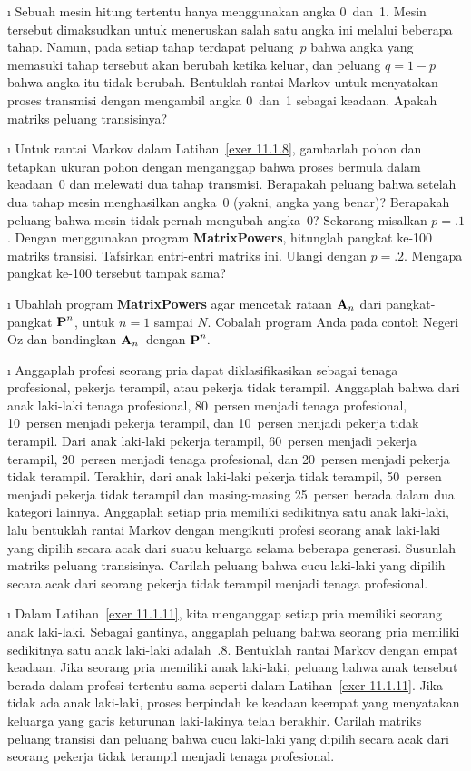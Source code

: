 \begin{LJSItem}
\i\label{exer 11.1.8} Sebuah mesin hitung tertentu hanya menggunakan angka
0~dan~1. Mesin tersebut dimaksudkan untuk meneruskan salah satu angka ini
melalui beberapa tahap. Namun, pada setiap tahap terdapat peluang~$p$ bahwa
angka yang memasuki tahap tersebut akan berubah ketika keluar, dan peluang $q
= 1 - p$ bahwa angka itu tidak berubah. Bentuklah rantai Markov untuk
menyatakan proses transmisi dengan mengambil angka 0~dan~1 sebagai keadaan.
Apakah matriks peluang transisinya?

\i\label{exer 11.1.9} Untuk rantai Markov dalam Latihan~\ref{exer 11.1.8},
gambarlah pohon dan tetapkan ukuran pohon dengan menganggap bahwa proses bermula
dalam keadaan~0 dan melewati dua tahap transmisi. Berapakah peluang bahwa
setelah dua tahap mesin menghasilkan angka~0 (yakni, angka yang benar)?
Berapakah peluang bahwa mesin tidak pernah mengubah angka~0? Sekarang misalkan
$p = .1$. Dengan menggunakan program {\bf MatrixPowers}, hitunglah pangkat
ke-100 matriks transisi. Tafsirkan entri-entri matriks ini. Ulangi dengan $p =
.2$. Mengapa pangkat ke-100 tersebut tampak sama?

\i\label{exer 11.1.10} Ubahlah program {\bf MatrixPowers} agar mencetak rataan
$ {\mbox{\bf A}\/}_n$ dari pangkat-pangkat ${\mbox{\bf P}\/}^n$, untuk $n = 1$ sampai $N$.
Cobalah program Anda pada contoh Negeri Oz dan bandingkan ${\mbox{\bf A}\/}_n$~dengan
${\mbox{\bf P}\/}^n.$

\i\label{exer 11.1.11} Anggaplah profesi seorang pria dapat diklasifikasikan
sebagai tenaga profesional, pekerja terampil, atau pekerja tidak terampil.
Anggaplah bahwa dari anak laki-laki tenaga profesional, 80~persen menjadi
tenaga profesional, 10~persen menjadi pekerja terampil, dan 10~persen menjadi
pekerja tidak terampil. Dari anak laki-laki pekerja terampil, 60~persen menjadi
pekerja terampil, 20~persen menjadi tenaga profesional, dan 20~persen menjadi
pekerja tidak terampil. Terakhir, dari anak laki-laki pekerja tidak terampil,
50~persen menjadi pekerja tidak terampil dan masing-masing 25~persen berada
dalam dua kategori lainnya. Anggaplah setiap pria memiliki sedikitnya satu
anak laki-laki, lalu bentuklah rantai Markov dengan mengikuti profesi seorang
anak laki-laki yang dipilih secara acak dari suatu keluarga selama beberapa
generasi. Susunlah matriks peluang transisinya. Carilah peluang bahwa cucu
laki-laki yang dipilih secara acak dari seorang pekerja tidak terampil menjadi
tenaga profesional.

\i\label{exer 11.1.12} Dalam Latihan~\ref{exer 11.1.11}, kita menganggap setiap
pria memiliki seorang anak laki-laki. Sebagai gantinya, anggaplah peluang bahwa
seorang pria memiliki sedikitnya satu anak laki-laki adalah~.8. Bentuklah
rantai Markov dengan empat keadaan. Jika seorang pria memiliki anak laki-laki,
peluang bahwa anak tersebut berada dalam profesi tertentu sama seperti dalam
Latihan~\ref{exer 11.1.11}. Jika tidak ada anak laki-laki, proses berpindah ke
keadaan keempat yang menyatakan keluarga yang garis keturunan laki-lakinya
telah berakhir. Carilah matriks peluang transisi dan peluang bahwa cucu
laki-laki yang dipilih secara acak dari seorang pekerja tidak terampil menjadi
tenaga profesional.


\end{LJSItem}
